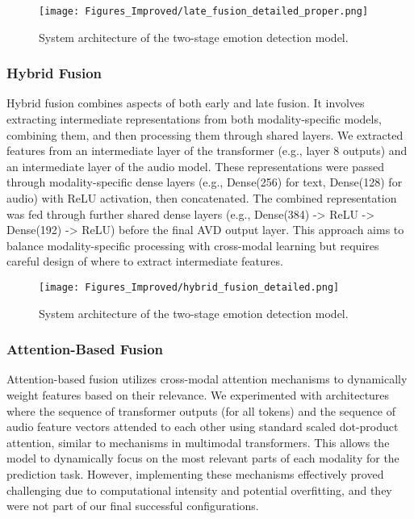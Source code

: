 \documentclass[12pt]{article}
\begin{document}
\begin{figure}[h]
    \centering
    \texttt{[image: Figures\_Improved/late\_fusion\_detailed\_proper.png]}
    \caption{System architecture of the two-stage emotion detection model.}
    \label{fig:late_fusion}
\end{figure}

\subsubsection{Hybrid Fusion}
Hybrid fusion combines aspects of both early and late fusion. It involves extracting intermediate representations from both modality-specific models, combining them, and then processing them through shared layers. We extracted features from an intermediate layer of the transformer (e.g., layer 8 outputs) and an intermediate layer of the audio model. These representations were passed through modality-specific dense layers (e.g., Dense(256) for text, Dense(128) for audio) with ReLU activation, then concatenated. The combined representation was fed through further shared dense layers (e.g., Dense(384) -> ReLU -> Dense(192) -> ReLU) before the final AVD output layer. This approach aims to balance modality-specific processing with cross-modal learning but requires careful design of where to extract intermediate features.

\begin{figure}[h]
    \centering
    \texttt{[image: Figures\_Improved/hybrid\_fusion\_detailed.png]}
    \caption{System architecture of the two-stage emotion detection model.}
    \label{fig:hybrid_fusion}
\end{figure}

\subsubsection{Attention-Based Fusion}
Attention-based fusion utilizes cross-modal attention mechanisms to dynamically weight features based on their relevance. We experimented with architectures where the sequence of transformer outputs (for all tokens) and the sequence of audio feature vectors attended to each other using standard scaled dot-product attention, similar to mechanisms in multimodal transformers. This allows the model to dynamically focus on the most relevant parts of each modality for the prediction task. However, implementing these mechanisms effectively proved challenging due to computational intensity and potential overfitting, and they were not part of our final successful configurations.
\end{document}
